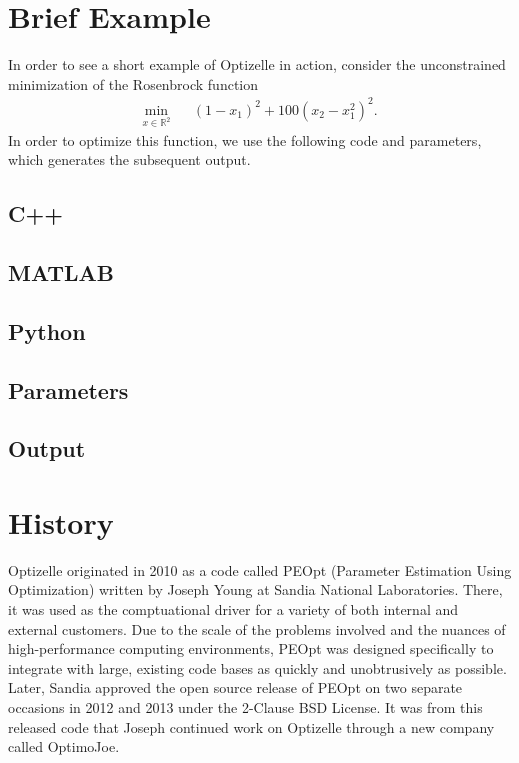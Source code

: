 \documentclass{report}
\newcommand{\re}{\mathbb{R}}
\begin{document}
\section{Brief Example}

        In order to see a short example of Optizelle in action, consider the unconstrained minimization of the Rosenbrock function
$$
    \begin{array}{rcl}
        \min\limits_{x\in\re^2} && (1-x_1)^2+100(x_2-x_1^2)^2.
    \end{array}
$$
In order to optimize this function, we use the following code and parameters, which generates the subsequent output.
\subsection{C++}

\subsection{MATLAB}

\subsection{Python}

\subsection{Parameters}

\subsection{Output}


\section{History}

        Optizelle originated in 2010 as a code called PEOpt (Parameter Estimation Using Optimization) written by Joseph Young at Sandia National Laboratories.  There, it was used as the comptuational driver for a variety of both internal and external customers.  Due to the scale of the problems involved and the nuances of high-performance computing environments, PEOpt was designed specifically to integrate with large, existing code bases as quickly and unobtrusively as possible.  Later, Sandia approved the open source release of PEOpt on two separate occasions in 2012 and 2013 under the 2-Clause BSD License.  It was from this released code that Joseph continued work on Optizelle through a new company called OptimoJoe.
        
\end{document}
